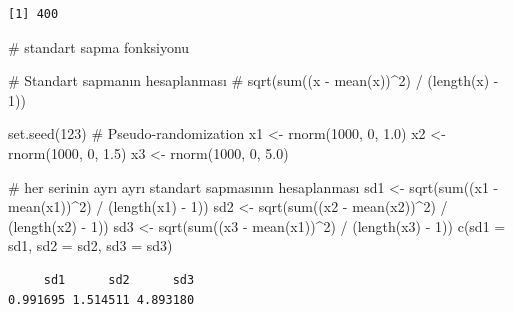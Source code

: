\documentclass[
  letterpaper,
  DIV=11,
  numbers=noendperiod]{scrreprt}
\newenvironment{Shaded}{\begin{snugshade}}{\end{snugshade}}
\newcommand{\AttributeTok}[1]{\textcolor[rgb]{0.40,0.45,0.13}{#1}}
\newcommand{\CommentTok}[1]{\textcolor[rgb]{0.37,0.37,0.37}{#1}}
\newcommand{\DecValTok}[1]{\textcolor[rgb]{0.68,0.00,0.00}{#1}}
\newcommand{\FloatTok}[1]{\textcolor[rgb]{0.68,0.00,0.00}{#1}}
\newcommand{\FunctionTok}[1]{\textcolor[rgb]{0.28,0.35,0.67}{#1}}
\newcommand{\NormalTok}[1]{\textcolor[rgb]{0.00,0.23,0.31}{#1}}
\newcommand{\OtherTok}[1]{\textcolor[rgb]{0.00,0.23,0.31}{#1}}
\newcommand{\SpecialCharTok}[1]{\textcolor[rgb]{0.37,0.37,0.37}{#1}}
\begin{document}
\begin{verbatim}
[1] 400
\end{verbatim}

\begin{Shaded}
\begin{Highlighting}[]
\CommentTok{\# standart sapma fonksiyonu}

\CommentTok{\# Standart sapmanın hesaplanması}
\CommentTok{\# sqrt(sum((x {-} mean(x))\^{}2) / (length(x) {-} 1))}

\FunctionTok{set.seed}\NormalTok{(}\DecValTok{123}\NormalTok{) }\CommentTok{\# Pseudo{-}randomization}
\NormalTok{x1 }\OtherTok{\textless{}{-}} \FunctionTok{rnorm}\NormalTok{(}\DecValTok{1000}\NormalTok{, }\DecValTok{0}\NormalTok{, }\FloatTok{1.0}\NormalTok{)}
\NormalTok{x2 }\OtherTok{\textless{}{-}} \FunctionTok{rnorm}\NormalTok{(}\DecValTok{1000}\NormalTok{, }\DecValTok{0}\NormalTok{, }\FloatTok{1.5}\NormalTok{)}
\NormalTok{x3 }\OtherTok{\textless{}{-}} \FunctionTok{rnorm}\NormalTok{(}\DecValTok{1000}\NormalTok{, }\DecValTok{0}\NormalTok{, }\FloatTok{5.0}\NormalTok{)}

\CommentTok{\# her serinin ayrı ayrı standart sapmasının hesaplanması}
\NormalTok{sd1 }\OtherTok{\textless{}{-}} \FunctionTok{sqrt}\NormalTok{(}\FunctionTok{sum}\NormalTok{((x1 }\SpecialCharTok{{-}} \FunctionTok{mean}\NormalTok{(x1))}\SpecialCharTok{\^{}}\DecValTok{2}\NormalTok{) }\SpecialCharTok{/}\NormalTok{ (}\FunctionTok{length}\NormalTok{(x1) }\SpecialCharTok{{-}} \DecValTok{1}\NormalTok{))}
\NormalTok{sd2 }\OtherTok{\textless{}{-}} \FunctionTok{sqrt}\NormalTok{(}\FunctionTok{sum}\NormalTok{((x2 }\SpecialCharTok{{-}} \FunctionTok{mean}\NormalTok{(x2))}\SpecialCharTok{\^{}}\DecValTok{2}\NormalTok{) }\SpecialCharTok{/}\NormalTok{ (}\FunctionTok{length}\NormalTok{(x2) }\SpecialCharTok{{-}} \DecValTok{1}\NormalTok{))}
\NormalTok{sd3 }\OtherTok{\textless{}{-}} \FunctionTok{sqrt}\NormalTok{(}\FunctionTok{sum}\NormalTok{((x3 }\SpecialCharTok{{-}} \FunctionTok{mean}\NormalTok{(x1))}\SpecialCharTok{\^{}}\DecValTok{2}\NormalTok{) }\SpecialCharTok{/}\NormalTok{ (}\FunctionTok{length}\NormalTok{(x3) }\SpecialCharTok{{-}} \DecValTok{1}\NormalTok{))}
\FunctionTok{c}\NormalTok{(}\AttributeTok{sd1 =}\NormalTok{ sd1, }\AttributeTok{sd2 =}\NormalTok{ sd2, }\AttributeTok{sd3 =}\NormalTok{ sd3)}
\end{Highlighting}
\end{Shaded}

\begin{verbatim}
     sd1      sd2      sd3 
0.991695 1.514511 4.893180 
\end{verbatim}
\end{document}
